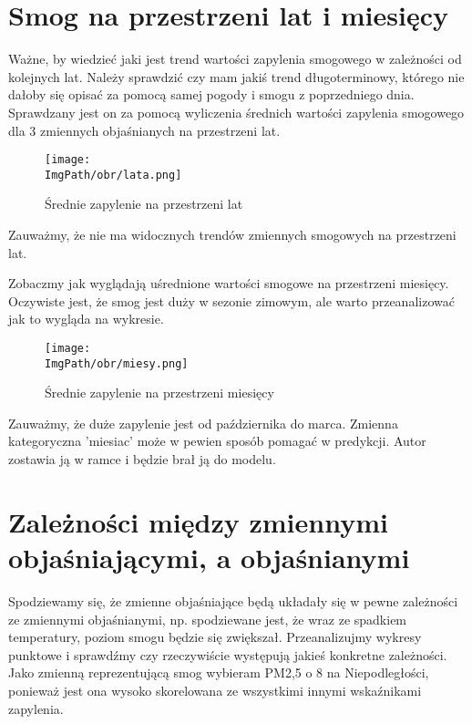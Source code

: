 \documentclass[a4paper,12pt,twoside,openany]{report}
\newcommand{\ImgPath}{.}
\begin{document}
\section{Smog na przestrzeni lat i miesięcy}

Ważne, by wiedzieć jaki jest trend wartości zapylenia smogowego w zależności od kolejnych lat. Należy sprawdzić czy mam jakiś trend długoterminowy, którego nie dałoby się opisać za pomocą samej pogody i smogu z poprzedniego dnia. Sprawdzany jest on za pomocą wyliczenia średnich wartości zapylenia smogowego dla 3 zmiennych objaśnianych na przestrzeni lat.

\begin{figure}[H]
	\begin{center}
		\centering
		\texttt{[image: \\ImgPath/obr/lata.png]}
	\end{center}
	\caption{Średnie zapylenie na przestrzeni lat}
	\label{lata}
\end{figure}

Zauważmy, że nie ma widocznych trendów zmiennych smogowych na przestrzeni lat.

Zobaczmy jak wyglądają uśrednione wartości smogowe na przestrzeni miesięcy. Oczywiste jest, że smog jest duży w sezonie zimowym, ale warto przeanalizować jak to wygląda na wykresie.

\begin{figure}[H]
	\begin{center}
		\centering
		\texttt{[image: \\ImgPath/obr/miesy.png]}
	\end{center}
	\caption{Średnie zapylenie na przestrzeni miesięcy}
	\label{miesy}
\end{figure}

Zauważmy, że duże zapylenie jest od października do marca. Zmienna kategoryczna 'miesiac' może w pewien sposób pomagać w predykcji. Autor zostawia ją w ramce i będzie brał ją do modelu.

\section{Zależności między zmiennymi objaśniającymi, a objaśnianymi}

Spodziewamy się, że zmienne objaśniające będą układały się w pewne zależności ze zmiennymi objaśnianymi, np. spodziewane jest, że wraz ze spadkiem temperatury, poziom smogu będzie się zwiększał. Przeanalizujmy wykresy punktowe i sprawdźmy czy rzeczywiście występują jakieś konkretne zależności. Jako zmienną reprezentującą smog wybieram PM2,5 o 8 na Niepodległości, ponieważ jest ona wysoko skorelowana ze wszystkimi innymi wskaźnikami zapylenia.
\end{document}
